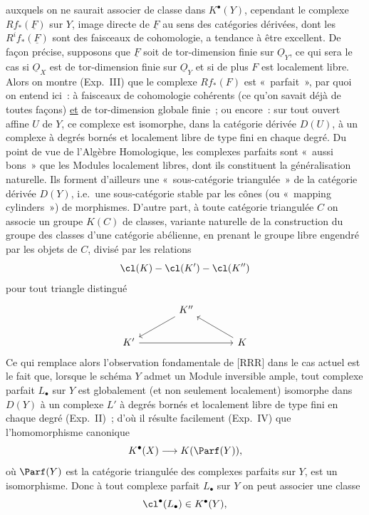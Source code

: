 auxquels on ne saurait associer de classe dans $K^\bullet(Y)$, cependant le complexe $Rf_*(\underline F)$ sur $Y$, image directe de $\underline F$ au sens des catégories dérivées, dont les $R^if_*(\underline F)$ sont des faisceaux de cohomologie, a tendance à être excellent. De façon précise, supposons que $\underline F$ soit de tor-dimension finie sur $\underline O_Y$, ce qui sera le cas si $\underline O_X$ est de tor-dimension finie sur $\underline O_Y$ et si de plus $F$ est localement libre. Alors on montre (Exp.\ III) que le complexe $Rf_*(F)$ est «~parfait~», par quoi on entend ici~: à faisceaux de cohomologie cohérents (ce qu'on savait déjà de toutes façons) \underline{et} de tor-dimension globale finie~; ou encore~: sur tout ouvert affine $U$ de $Y$, ce complexe est isomorphe, dans la catégorie dérivée $D(U)$, à un complexe à degrés bornés et localement libre de type fini en chaque degré. Du point de vue de l'Algèbre Homologique, les complexes parfaits sont «~aussi bons~» que les Modules localement libres, dont ils constituent la généralisation naturelle. Ils forment d'ailleurs une «~sous-catégorie triangulée~» de la catégorie dérivée $D(Y)$, i.e.\ une sous-catégorie stable par les cônes (ou «~mapping cylinders~») de morphismes. D'autre part, à toute catégorie triangulée $C$ on associe un groupe $K(C)$ de classes, variante naturelle de la construction du groupe des classes d'une catégorie abélienne, en prenant le groupe libre engendré par les objets de $C$, divisé par les relations
\[
\cl(K)-\cl(K')-\cl(K'')
\]
pour tout triangle distingué
\[
\begin{tikzcd}[column sep=large]
 & K'' \arrow[dl] & \\
K' \arrow[rr] & & K \arrow[ul]
\end{tikzcd}
\]
Ce qui remplace alors l'observation fondamentale de [RRR] dans le cas actuel est le fait que, lorsque le schéma $Y$ admet un Module inversible ample, tout complexe parfait $L_\bullet$ sur $Y$ est globalement (et non seulement localement) isomorphe dans $D(Y)$ à un complexe $L'$ à degrés bornés et localement libre de type fini en chaque degré (Exp.\ II)~; d'où il résulte facilement (Exp.\ IV) que l'homomorphisme canonique
\[
K^\bullet(X)\longrightarrow K(\Parf(Y)),
\]
où $\Parf(Y)$ est la catégorie triangulée des complexes parfaits sur $Y$, est un isomorphisme. Donc à tout complexe parfait $L_\bullet$ sur $Y$ on peut associer une classe
\[
\cl^\bullet(L_\bullet)\in K^\bullet(Y),
\]
